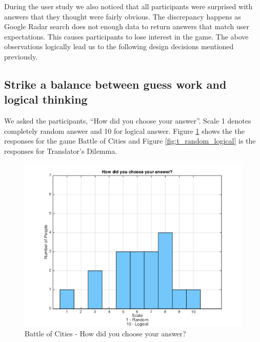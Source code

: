 \documentclass{sig-alternate}
\begin{document}
During the user study we also noticed that all participants were surprised with answers that they thought were fairly obvious. The discrepancy happens as Google Radar search does not enough data to return answers that match user expectations. This causes participants to lose interest in the game. The above observations logically lead us to the following design decisions mentioned previously.

\subsection{Strike a balance between guess work and logical thinking}
We asked the participants, ``How did you choose your answer''. Scale 1 denotes completely random answer and 10 for logical answer. Figure \ref{fig:p_random_logical} shows the the responses for the game Battle of Cities and Figure \ref{fig:t_random_logical} is the responses for Translator's Dilemma. 

\begin{figure}
	\includegraphics[width=\linewidth]{p_random_logical.png}
	\caption{Battle of Cities - How did you choose your answer?}
	\label{fig:p_random_logical}
\end{figure}
\end{document}
